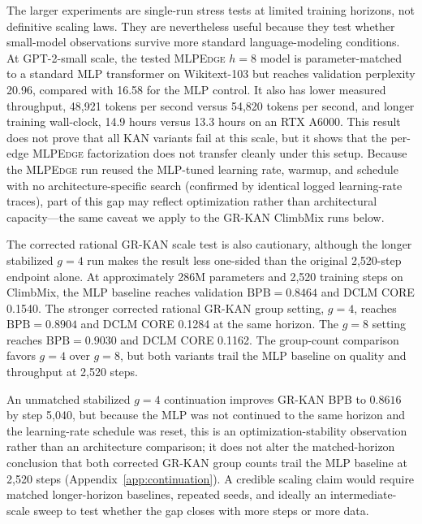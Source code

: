 \documentclass{article}
\newcommand{\modelname}[1]{\textsc{#1}}
\newcommand{\bpb}{\mathrm{BPB}}
\newcommand{\grkan}{\modelname{GR-KAN}}
\newcommand{\mlpedge}{\modelname{MLPEdge}}
\begin{document}
The larger experiments are single-run stress tests at limited training horizons, not definitive scaling laws. They are nevertheless useful because they test whether small-model observations survive more standard language-modeling conditions. At GPT-2-small scale, the tested \mlpedge{} \(h=8\) model is parameter-matched to a standard MLP transformer on Wikitext-103 but reaches validation perplexity 20.96, compared with 16.58 for the MLP control. It also has lower measured throughput, 48,921 tokens per second versus 54,820 tokens per second, and longer training wall-clock, 14.9 hours versus 13.3 hours on an RTX A6000. This result does not prove that all KAN variants fail at this scale, but it shows that the per-edge \mlpedge{} factorization does not transfer cleanly under this setup. Because the \mlpedge{} run reused the MLP-tuned learning rate, warmup, and schedule with no architecture-specific search (confirmed by identical logged learning-rate traces), part of this gap may reflect optimization rather than architectural capacity---the same caveat we apply to the \grkan{} ClimbMix runs below.

The corrected rational \grkan{} scale test is also cautionary, although the longer stabilized \(g=4\) run makes the result less one-sided than the original 2,520-step endpoint alone. At approximately 286M parameters and 2,520 training steps on ClimbMix, the MLP baseline reaches validation \(\bpb=0.8464\) and DCLM CORE 0.1540. The stronger corrected rational \grkan{} group setting, \(g=4\), reaches \(\bpb=0.8904\) and DCLM CORE 0.1284 at the same horizon. The \(g=8\) setting reaches \(\bpb=0.9030\) and DCLM CORE 0.1162. The group-count comparison favors \(g=4\) over \(g=8\), but both variants trail the MLP baseline on quality and throughput at 2,520 steps.

An unmatched stabilized \(g=4\) continuation improves \grkan{} BPB to \(0.8616\) by step 5,040, but because the MLP was not continued to the same horizon and the learning-rate schedule was reset, this is an optimization-stability observation rather than an architecture comparison; it does not alter the matched-horizon conclusion that both corrected \grkan{} group counts trail the MLP baseline at 2,520 steps (Appendix~\ref{app:continuation}). A credible scaling claim would require matched longer-horizon baselines, repeated seeds, and ideally an intermediate-scale sweep to test whether the gap closes with more steps or more data.
\end{document}
